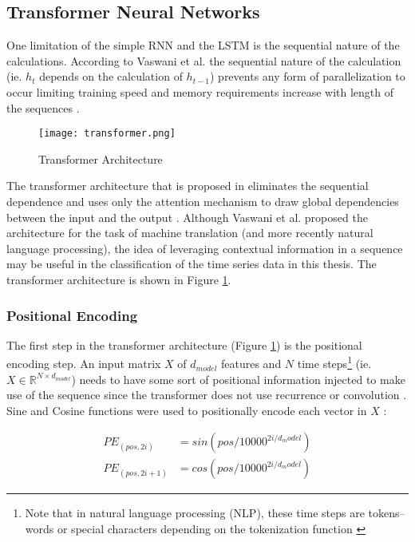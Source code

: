 \subsection{Transformer Neural Networks}
One limitation of the simple RNN and the LSTM is the sequential nature of the calculations. According to Vaswani et al. the sequential nature of the calculation (ie. $h_t$ depends on the calculation of $h_{t-1}$) prevents any form of parallelization to occur limiting training speed and memory requirements increase with length of the sequences \cite{vaswaniAttentionAllYou2023}. 

\begin{figure}[ht]
    \centering
    \texttt{[image: transformer.png]}
    \caption{Transformer Architecture \cite{vaswaniAttentionAllYou2023}}
    \label{fig:transformer-arch}
\end{figure}

The transformer architecture that is proposed in \cite{vaswaniAttentionAllYou2023} eliminates the sequential dependence and uses only the attention mechanism to draw global dependencies between the input and the output \cite{vaswaniAttentionAllYou2023}. Although Vaswani et al. proposed the architecture for the task of machine translation (and more recently natural language processing), the idea of leveraging contextual information in a sequence may be useful in the classification of the time series data in this thesis. The transformer architecture is shown in Figure \ref{fig:transformer-arch}.

\subsubsection{Positional Encoding}
The first step in the transformer architecture (Figure \ref{fig:transformer-arch}) is the positional encoding step. An input matrix $X$ of $d_{model}$ features and $N$ time steps\footnote{Note that in natural language processing (NLP), these time steps are tokens--words or special characters depending on the tokenization function \cite{TorchtextdatautilsTorchtext0180}} (ie. $X \in \mathbb{R}^{N \times d_{model}}$) needs to have some sort of positional information injected to make use of the sequence since the transformer does not use recurrence or convolution \cite{vaswaniAttentionAllYou2023}. Sine and Cosine functions were used to positionally encode each vector in $X$ \cite{vaswaniAttentionAllYou2023}:

\begin{equation}
    \label{eq:pos-encoding}
    \begin{split}
        PE_{(pos, 2i)} &= sin(pos/10000^{2i/d_model})\\
        PE_{(pos, 2i + 1)} &= cos(pos/10000^{2i/d_model})
    \end{split}
\end{equation}

